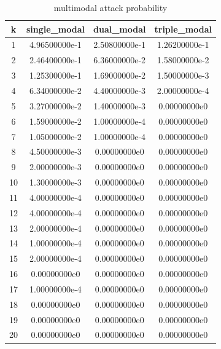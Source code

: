 \begin{table}[h]
\centering
\begin{tabular}{|c|c|c|c|}
\hline
k & single_modal & dual_modal & triple_modal \\ \hline
1 & 4.96500000e-1 & 2.50800000e-1 & 1.26200000e-1 \\
2 & 2.46400000e-1 & 6.36000000e-2 & 1.58000000e-2 \\
3 & 1.25300000e-1 & 1.69000000e-2 & 1.50000000e-3 \\
4 & 6.34000000e-2 & 4.40000000e-3 & 2.00000000e-4 \\
5 & 3.27000000e-2 & 1.40000000e-3 & 0.00000000e0 \\
6 & 1.59000000e-2 & 1.00000000e-4 & 0.00000000e0 \\
7 & 1.05000000e-2 & 1.00000000e-4 & 0.00000000e0 \\
8 & 4.50000000e-3 & 0.00000000e0 & 0.00000000e0 \\
9 & 2.00000000e-3 & 0.00000000e0 & 0.00000000e0 \\
10 & 1.30000000e-3 & 0.00000000e0 & 0.00000000e0 \\
11 & 4.00000000e-4 & 0.00000000e0 & 0.00000000e0 \\
12 & 4.00000000e-4 & 0.00000000e0 & 0.00000000e0 \\
13 & 2.00000000e-4 & 0.00000000e0 & 0.00000000e0 \\
14 & 1.00000000e-4 & 0.00000000e0 & 0.00000000e0 \\
15 & 2.00000000e-4 & 0.00000000e0 & 0.00000000e0 \\
16 & 0.00000000e0 & 0.00000000e0 & 0.00000000e0 \\
17 & 1.00000000e-4 & 0.00000000e0 & 0.00000000e0 \\
18 & 0.00000000e0 & 0.00000000e0 & 0.00000000e0 \\
19 & 0.00000000e0 & 0.00000000e0 & 0.00000000e0 \\
20 & 0.00000000e0 & 0.00000000e0 & 0.00000000e0 \\
\hline
\end{tabular}
\caption{multimodal attack probability}
\label{tab:T08}
\end{table}
